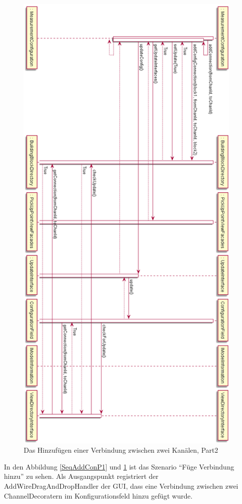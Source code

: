 \documentclass[parskip=full]{scrartcl}
\begin{document}
\begin{figure}[htbp]
	\begin{center}
		\includegraphics[width = 11cm]{Grafiken/AddConQuerPart2.png}
		\caption{Das Hinzufügen einer Verbindung zwischen zwei Kanälen, Part2}
		\label{SeqAddConP2}
	\end{center}
\end{figure}

In den Abbildung \ref{SeqAddConP1}  und \ref{SeqAddConP2} ist das Szenario "`Füge Verbindung hinzu"' zu sehen. Als Ausgangspunkt registriert der AddWireDragAndDropHandler der GUI, dass eine Verbindung zwischen zwei ChannelDecoratern im Konfigurationsfeld hinzu gefügt wurde.
\end{document}
